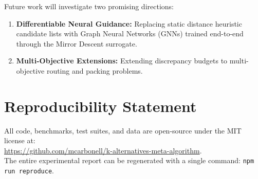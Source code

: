 \documentclass[11pt,a4paper]{article}
\begin{document}
Future work will investigate two promising directions:
\begin{enumerate}
    \item \textbf{Differentiable Neural Guidance:} Replacing static distance heuristic candidate lists with Graph Neural Networks (GNNs) trained end-to-end through the Mirror Descent surrogate.
    \item \textbf{Multi-Objective Extensions:} Extending discrepancy budgets to multi-objective routing and packing problems.
\end{enumerate}

\section*{Reproducibility Statement}
All code, benchmarks, test suites, and data are open-source under the MIT license at:\\
\url{https://github.com/mcarbonell/k-alternatives-meta-algorithm}.\\
The entire experimental report can be regenerated with a single command:
\texttt{npm run reproduce}.

\newpage


\end{document}
